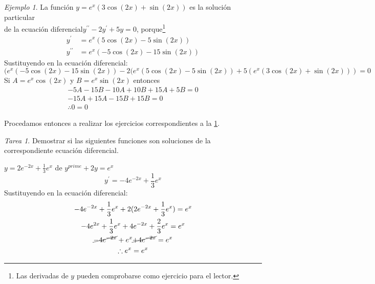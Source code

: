 \documentclass[12pt]{article} %
\theoremstyle{remark} %
\newtheorem{tarea}{Tarea}[section] %
\newcounter{ejercicio}[tarea]
\newtheorem{ejemplo}{Ejemplo}[section]
\newcommand{\ed}{ecuación diferencial}
\begin{document}
\begin{ejemplo}
  La función $y = e^x (3 \cos (2x) + \sin (2x))$ es la solución particular \\
  de la \ed $y^{\prime \prime} - 2y^{\prime} + 5y = 0$, 
  porque\footnote{Las derivadas de $y$ pueden comprobarse como ejercicio para el lector.}
  \begin{align*}
    y^{\prime} &= e^x (5 \cos (2x) - 5 \sin (2x)) \\
    y^{\prime \prime} &= e^x (-5 \cos (2x) - 15 \sin (2x))
  \end{align*}
  Sustituyendo en la \ed :
  \[(e^x(-5 \cos (2x) -15 \sin (2x)) - 2(e^x(5 \cos (2x) -5 \sin (2x)) 
  +5(e^x(3 \cos (2x) + \sin (2x))) = 0\]
  Si $A = e^x \cos(2x)$ y $B = e^x \sin(2x)$ entonces
  \begin{gather*}
    -5A - 15B -10A + 10B +15A + 5B = 0\\
    -15A + 15A -15B + 15 B = 0\\
    \therefore 0 = 0
  \end{gather*}
\end{ejemplo}

Procedamos entonces a realizar los ejercicios correspondientes a la \cref{tarea:soluciones}.

\begin{tarea}\label{tarea:soluciones}
  Demostrar si las siguientes funciones son soluciones de la correspondiente ecuación diferencial.\\
  \begin{ejercicio}[2]
  $y = 2e^{-2x} + \frac{1}{3} e^x$ de $y^{prime} + 2y = e^x$
    \[ y^{\prime} = -4e^{-2x} + \frac{1}{3} e^x \]
    Sustituyendo en la \ed:
    \begin{gather*}
      -4e^{-2x} + \frac{1}{3} e^x + 2(2e^{-2x} + \frac{1}{3} e^x) = e^x\\
      -4e^{2x} + \frac{1}{3} e^x + 4e^{-2x} + \frac{2}{3} e^x = e^x\\
      \cancel{-4e^{-2x}} + e^x \cancel{+ 4e^{-2x}} = e^x\\
      \therefore e^x = e^x
    \end{gather*}
  \end{ejercicio}
\end{tarea}
\end{document}
